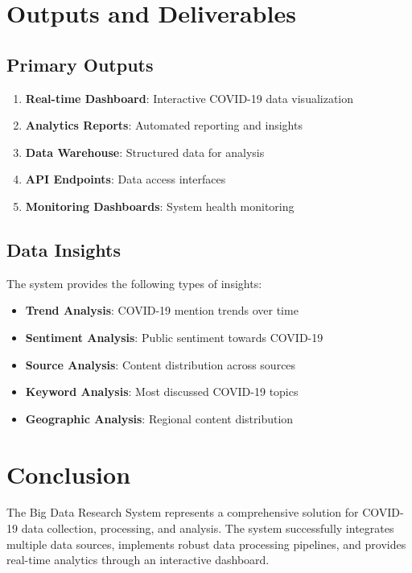 \documentclass[12pt,a4paper]{article}
\begin{document}
\section{Outputs and Deliverables}

\subsection{Primary Outputs}
\begin{enumerate}
    \item \textbf{Real-time Dashboard}: Interactive COVID-19 data visualization
    \item \textbf{Analytics Reports}: Automated reporting and insights
    \item \textbf{Data Warehouse}: Structured data for analysis
    \item \textbf{API Endpoints}: Data access interfaces
    \item \textbf{Monitoring Dashboards}: System health monitoring
\end{enumerate}

\subsection{Data Insights}
The system provides the following types of insights:
\begin{itemize}
    \item \textbf{Trend Analysis}: COVID-19 mention trends over time
    \item \textbf{Sentiment Analysis}: Public sentiment towards COVID-19
    \item \textbf{Source Analysis}: Content distribution across sources
    \item \textbf{Keyword Analysis}: Most discussed COVID-19 topics
    \item \textbf{Geographic Analysis}: Regional content distribution
\end{itemize}

\section{Conclusion}

The Big Data Research System represents a comprehensive solution for COVID-19 data collection, processing, and analysis. The system successfully integrates multiple data sources, implements robust data processing pipelines, and provides real-time analytics through an interactive dashboard.
\end{document}
